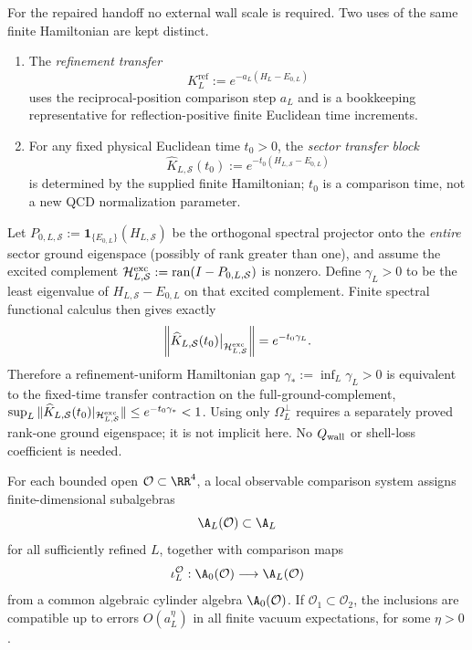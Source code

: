 \documentclass[12pt,a4paper]{article}
\begin{document}
\begin{definition}
\label{p12:def:transfer-scale-convention}
For the repaired handoff no external wall scale is required.  Two uses of the same finite Hamiltonian are kept distinct.
\begin{enumerate}[label=\textnormal{(\roman*)}, leftmargin=2.2em]
\item The \emph{refinement transfer}
\begin{equation}
\label{p12:eq:refinement-transfer}
K_L^{\mathrm{ref}}:=e^{-a_L(H_L-E_{0,L})}
\end{equation}
uses the reciprocal-position comparison step \(a_L\) and is a bookkeeping representative for reflection-positive finite Euclidean time increments.
\item For any fixed physical Euclidean time \(t_0>0\), the \emph{sector transfer block}
\begin{equation}
\label{p12:eq:physical-sector-transfer}
\widehat K_{L,\mathcal S}(t_0):=e^{-t_0(H_{L,\mathcal S}-E_{0,L})}
\end{equation}
is determined by the supplied finite Hamiltonian; \(t_0\) is a comparison time, not a new QCD normalization parameter.
\end{enumerate}
Let \(P_{0,L,\mathcal S}:=\mathbf 1_{\{E_{0,L}\}}(H_{L,\mathcal S})\)
be the orthogonal spectral projector onto the \emph{entire} sector ground
eigenspace (possibly of rank greater than one), and assume the excited
complement \(\mathcal H_{L,\mathcal S}^{\rm exc}:=
\operatorname{ran}(I-P_{0,L,\mathcal S})\) is nonzero.
Define \(\gamma_L>0\) to be the least eigenvalue of
\(H_{L,\mathcal S}-E_{0,L}\) on that excited complement. Finite spectral
functional calculus then gives exactly
\[
\left\|\widehat K_{L,\mathcal S}(t_0)
 \big|_{\mathcal H_{L,\mathcal S}^{\rm exc}}\right\|
=e^{-t_0\gamma_L}.
\]
Therefore a refinement-uniform Hamiltonian gap
\(\gamma_*:=\inf_L\gamma_L>0\) is equivalent to the fixed-time
transfer contraction on the full-ground-complement,
\(\sup_L\|\widehat K_{L,\mathcal S}(t_0)
|_{\mathcal H_{L,\mathcal S}^{\rm exc}}\|
\le e^{-t_0\gamma_*}<1\).
Using only \(\Omega_L^\perp\) requires a separately proved rank-one
ground eigenspace; it is not implicit here. No \(Q_{\rm wall}\) or
shell-loss coefficient is needed.
\end{definition}

\begin{definition}
\label{p12:def:local-comparison-system}
For each bounded open \(\mathcal O\subset\RR^4\), a local observable comparison system assigns finite-dimensional subalgebras
\[
\A_L(\mathcal O)\subset\A_L
\]
for all sufficiently refined \(L\), together with comparison maps
\[
\iota_{L}^{\mathcal O}:\A_0(\mathcal O)\longrightarrow \A_L(\mathcal O)
\]
from a common algebraic cylinder algebra \(\A_0(\mathcal O)\).  If \(\mathcal O_1\subset\mathcal O_2\), the inclusions are compatible up to errors \(O(a_L^\eta)\) in all finite vacuum expectations, for some \(\eta>0\).
\end{definition}
\end{document}
